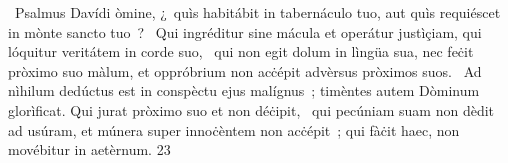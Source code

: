 {~Psalmus Davídi}
{%
òmine, ¿~quìs habitábit in tabernáculo tuo, aut quìs requiéscet in mònte sancto tuo~?
~Qui ingréditur sine mácula et operátur justìçiam, qui lóquitur veritátem in corde suo,
~qui non egit dolum in lìngüa sua, nec feċit pròximo suo màlum, et oppróbrium non acċépit advèrsus pròximos suos.
~Ad nìhilum dedúctus est in conspèctu ejus malígnus~; timèntes autem Dòminum glorìficat. Qui jurat pròximo suo et non déċipit,
~qui pecúniam suam non dèdit ad usúram, et múnera super innoċèntem non acċépit~; qui fàċit haec, non movébitur in aetèrnum.
}
{2}{3}
